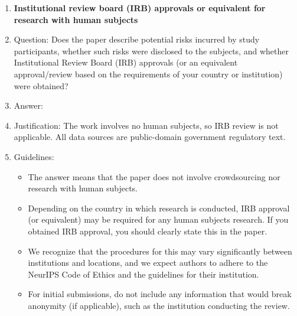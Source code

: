 \begin{enumerate}
\item {\bf Institutional review board (IRB) approvals or equivalent for research with human subjects}
    \item[] Question: Does the paper describe potential risks incurred by study participants, whether such risks were disclosed to the subjects, and whether Institutional Review Board (IRB) approvals (or an equivalent approval/review based on the requirements of your country or institution) were obtained?
    \item[] Answer: \answerNA{}
    \item[] Justification: The work involves no human subjects, so IRB review is not applicable. All data sources are public-domain government regulatory text.
    \item[] Guidelines:
    \begin{itemize}
        \item The answer \answerNA{} means that the paper does not involve crowdsourcing nor research with human subjects.
        \item Depending on the country in which research is conducted, IRB approval (or equivalent) may be required for any human subjects research. If you obtained IRB approval, you should clearly state this in the paper.
        \item We recognize that the procedures for this may vary significantly between institutions and locations, and we expect authors to adhere to the NeurIPS Code of Ethics and the guidelines for their institution.
        \item For initial submissions, do not include any information that would break anonymity (if applicable), such as the institution conducting the review.
    \end{itemize}


\end{enumerate}
